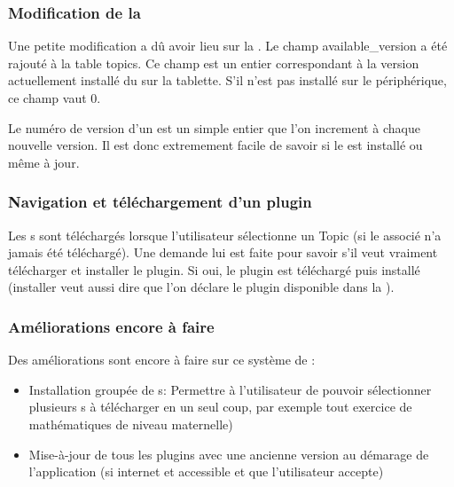 \subsubsection{Modification de la \bdd{}}
Une petite modification a dû avoir lieu sur la \bdd{}. Le champ \og{}available\_version\fg{} a été rajouté à la table \og{}topics\fg{}. Ce champ est un entier correspondant à la version actuellement installé du \plugin{} sur la tablette. S'il n'est pas installé sur le périphérique, ce champ vaut \og{}$0$\fg{}.

Le numéro de version d'un \plugin{} est un simple entier que l'on increment à chaque nouvelle version. Il est donc extremement facile de savoir si le \plugin{} est installé ou même à jour.

\subsubsection{Navigation et téléchargement d'un plugin}
Les \plugin s sont téléchargés lorsque l'utilisateur sélectionne un Topic (si le \plugin{} associé n'a jamais été téléchargé). Une demande lui est faite pour savoir s'il veut vraiment télécharger et installer le plugin. 
Si oui, le plugin est téléchargé puis installé (installer veut aussi dire que l'on déclare le plugin disponible dans la \bdd{}).

\subsubsection{Améliorations encore à faire}
Des améliorations sont encore à faire sur ce système de \plugin{}:
\begin{itemize}
    \item Installation groupée de \plugin s:
    \newline Permettre à l'utilisateur de pouvoir sélectionner plusieurs \plugin s à télécharger en un seul coup, par exemple tout exercice de mathématiques de niveau maternelle)
    \item Mise-à-jour de tous les plugins avec une ancienne version au démarage de l'application (si internet et accessible et que l'utilisateur accepte)
\end{itemize}
